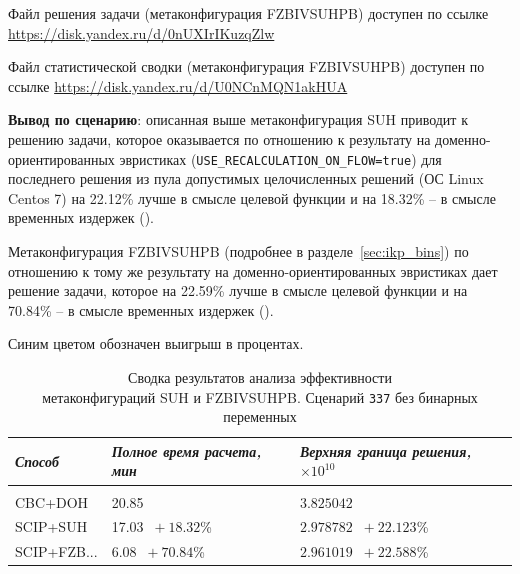 \documentclass[%
	11pt,
	a4paper,
	utf8,
		]{article}
\begin{document}
Файл решения задачи (метаконфигурация FZBIVSUHPB) доступен по ссылке \url{https://disk.yandex.ru/d/0nUXIrIKuzqZlw}

Файл статистической сводки (метаконфигурация FZBIVSUHPB) доступен по ссылке \url{https://disk.yandex.ru/d/U0NCnMQN1akHUA}

\vspace*{3mm}
\textbf{Вывод по сценарию}: описанная выше метаконфигурация SUH приводит к решению задачи, которое оказывается по отношению к результату на доменно-ориентированных эвристиках (\verb|USE_RECALCULATION_ON_FLOW=true|) для последнего решения из пула допустимых целочисленных решений (ОС Linux Centos 7) на 22.12\% лучше в смысле целевой функции и на 18.32\% -- в смысле временных издержек ().

Метаконфигурация FZBIVSUHPB (подробнее в разделе~\ref{sec:ikp_bins}) по отношению к тому же результату на доменно-ориентированных эвристиках дает решение задачи, которое на 22.59\% лучше в смысле целевой функции и на 70.84\% -- в смысле временных издержек ().

Синим цветом обозначен выигрыш в процентах.

{
	\begin{table}[!h]
		\centering
		\caption{Сводка результатов анализа эффективности \\метаконфигураций SUH и FZBIVSUHPB. Сценарий \texttt{337} без бинарных переменных}
		\begin{tabular}{ p{2.5cm} p{3.3cm} p{3.4cm} }
			\emph{Способ} & \emph{Полное время расчета, мин} & \emph{Верхняя граница решения, $ \times 10^{10} $} \\
			\hline\hline\\[-3.5mm]
			{CBC+DOH} & 20.85 & $ 3.825042 $ \\
			\hline
			SCIP+SUH & 17.03 {\color{blue} $\ +18.32 $\%} & $ 2.978782 $ {\color{blue} $\ +22.123 $\%} \\
			\hline
			SCIP+FZB... & 6.08 {\color{blue} $\ +70.84 $\%} & $ 2.961019 $ {\color{blue} $\ +22.588 $\%} \\
		\end{tabular}\label{tab:337_wo_bins}
	\end{table}
}
\end{document}
